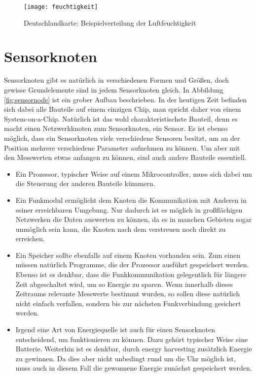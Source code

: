 \begin{figure}[htbp]
\centering
\caption{Deutschlandkarte: Beispielverteilung der Luftfeuchtigkeit}
\label{fig:feuchtigkeit}
\texttt{[image: feuchtigkeit]}
\end{figure}

\section{Sensorknoten}

Sensorknoten gibt es natürlich in verschiedenen Formen und Größen, doch gewisse Grundelemente sind in jedem Sensorknoten gleich. In Abbildung \ref{fig:sensornode} ist ein grober Aufbau beschrieben. In der heutigen Zeit befinden sich dabei alle Bauteile auf einem einzigen Chip, man spricht daher von einem System-on-a-Chip.\newline
Natürlich ist das wohl charakteristischste Bauteil, denn es macht einen Netzwerkknoten zum Sensorknoten, ein Sensor. Es ist ebenso möglich, dass ein Sensorknoten viele verschiedene Sensoren besitzt, um an der Position mehrere verschiedene Parameter aufnehmen zu können.\newline
Um aber mit den Messwerten etwas anfangen zu können, sind auch andere Bauteile essentiell. 

\begin{itemize}
\item Ein Prozessor, typischer Weise auf einem Mikrocontroller, muss sich dabei um die Steuerung der anderen Bauteile kümmern.
\item Ein Funkmodul ermöglicht dem Knoten die Kommunikation mit Anderen in seiner erreichbaren Umgebung. Nur dadurch ist es möglich in großflächigen Netzwerken die Daten auswerten zu können, da es in manchen Gebieten sogar unmöglich sein kann, die Knoten nach dem verstreuen noch direkt zu erreichen.
\item Ein Speicher sollte ebenfalls auf einem Knoten vorhanden sein. Zum einen müssen natürlich Programme, die der Prozessor ausführt gespeichert werden. Ebenso ist es denkbar, dass die Funkkommunikation gelegentlich für längere Zeit abgeschaltet wird, um so Energie zu sparen. Wenn innerhalb dieses Zeitraums relevante Messwerte bestimmt wurden, so sollen diese natürlich nicht einfach verfallen, sondern bis zur nächsten Funkverbindung gesichert werden.
\item Irgend eine Art von Energiequelle ist auch für einen Sensorknoten entscheidend, um funktionieren zu können. Dazu gehört typischer Weise eine Batterie. Weiterhin ist es denkbar, durch energy harvesting zusätzlich Energie zu gewinnen. Da dies aber nicht unbedingt rund um die Uhr möglich ist, muss auch in diesem Fall die gewonnene Energie zunächst gespeichert werden.
\end{itemize}

